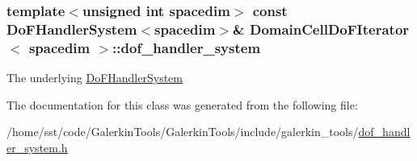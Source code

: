 \subsubsection[{\texorpdfstring{dof\+\_\+handler\+\_\+system}{dof_handler_system}}]{\setlength{\rightskip}{0pt plus 5cm}template$<$unsigned int spacedim$>$ const {\bf Do\+F\+Handler\+System}$<$spacedim$>$\& {\bf Domain\+Cell\+Do\+F\+Iterator}$<$ spacedim $>$\+::dof\+\_\+handler\+\_\+system\hspace{0.3cm}{\ttfamily [private]}}\hypertarget{class_domain_cell_do_f_iterator_a7431a0505f1e5b0b796c7f58cf9a060c}{}\label{class_domain_cell_do_f_iterator_a7431a0505f1e5b0b796c7f58cf9a060c}
The underlying \hyperlink{class_do_f_handler_system}{Do\+F\+Handler\+System} 

The documentation for this class was generated from the following file\+:\begin{DoxyCompactItemize}
\item 
/home/sst/code/\+Galerkin\+Tools/\+Galerkin\+Tools/include/galerkin\+\_\+tools/\hyperlink{dof__handler__system_8h}{dof\+\_\+handler\+\_\+system.\+h}\end{DoxyCompactItemize}
